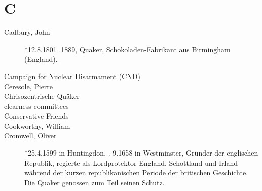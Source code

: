 \section*{C}

\articlesize

\begin{description}

 \item[Cadbury, John] $\ast$12.8.1801 .1889, Quaker, Schokoladen-Fabrikant aus Birmingham (England).

 \item[Campaign for Nuclear Disarmament (CND)]

 \item[Ceresole, Pierre]

 \item[Chrisozentrische Quäker]

 \item[clearness committees]

 \item[Conservative Friends]

 \item[Cookworthy, William]

 \item[Cromwell, Oliver] $\ast$25.4.1599 in Huntingdon, . 9.1658 in Westminster, Gründer der englischen Republik, regierte als Lordprotektor England, Schottland und Irland während der kurzen republikanischen Periode der britischen Geschichte. Die Quaker genossen zum Teil seinen Schutz.

 \end{description}

\normalsize